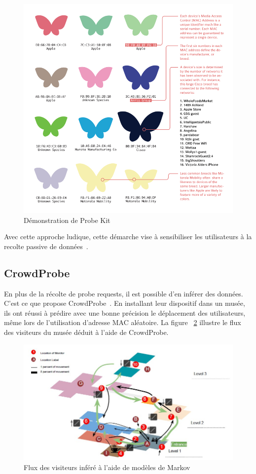 \begin{figure}[H]
	\centering
	\includegraphics[width=12cm]{images/probekit.png}
	\caption{Démonstration de Probe Kit}
	\label{fig:probekit}
\end{figure}

Avec cette approche ludique, cette démarche vise à sensibiliser les utilisateurs à la recolte passive de données~\cite{BROWIFI}.

\subsection{CrowdProbe}

En plus de la récolte de probe requests, il est possible d'en inférer des données. C'est ce que propose CrowdProbe~\cite{crowdprobe}. 
En installant leur dispositif dans un musée, ils ont réussi à prédire avec une bonne précision le déplacement des utilisateurs, même lors de l'utilisation d'adresse MAC aléatoire.
La figure ~\ref{fig:crowdprobe} illustre le flux des visiteurs du musée déduit à l'aide de CrowdProbe.
\begin{figure}[H]
	\centering
	\includegraphics[width=12cm]{images/crowd-probe.jpeg}
	\caption{Flux des visiteurs inféré à l'aide de modèles de Markov}
	\label{fig:crowdprobe}
\end{figure}

